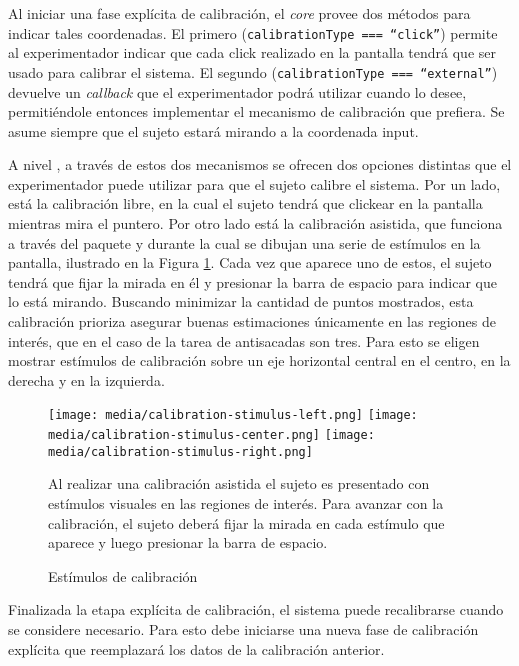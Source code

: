 Al iniciar una fase explícita de calibración, el \textit{core} provee dos
métodos para indicar tales coordenadas.
El primero (\texttt{calibrationType === “click”}) permite al experimentador
indicar que cada click realizado en la pantalla tendrá que ser usado para
calibrar el sistema.
El segundo (\texttt{calibrationType === “external”}) devuelve un
\textit{callback} que el experimentador podrá utilizar cuando lo desee,
permitiéndole entonces implementar el mecanismo de calibración que prefiera.
Se asume siempre que el sujeto estará mirando a la coordenada input.

A nivel \jspsych, a través de estos dos mecanismos se ofrecen dos opciones
distintas que el experimentador puede utilizar para que el sujeto calibre el
sistema.
Por un lado, está la calibración libre, en la cual el sujeto tendrá que
clickear en la pantalla mientras mira el puntero.
Por otro lado está la calibración asistida, que funciona a través del paquete
\psychophysics [0.2] y durante la cual se dibujan una serie de estímulos en la
pantalla, ilustrado en la Figura \ref{fig:calibration_stimulus}.
Cada vez que aparece uno de estos, el sujeto tendrá que fijar la mirada en él y
presionar la barra de espacio para indicar que lo está mirando.
Buscando minimizar la cantidad de puntos mostrados, esta calibración prioriza
asegurar buenas estimaciones únicamente en las regiones de interés, que en el
caso de la tarea de antisacadas son tres.
Para esto se eligen mostrar estímulos de calibración sobre un eje horizontal
central en el centro, en la derecha y en la izquierda.

\begin{figure}
    \centering
    \texttt{[image: media/calibration-stimulus-left.png]}
    \texttt{[image: media/calibration-stimulus-center.png]}
    \texttt{[image: media/calibration-stimulus-right.png]}
    \caption{Estímulos de calibración}
    Al realizar una calibración asistida el sujeto es presentado con estímulos
    visuales en las regiones de interés.
    Para avanzar con la calibración, el sujeto deberá fijar la mirada en cada
    estímulo que aparece y luego presionar la barra de espacio. \\
    \label{fig:calibration_stimulus}
\end{figure}

Finalizada la etapa explícita de calibración, el sistema puede recalibrarse
cuando se considere necesario.
Para esto debe iniciarse una nueva fase de calibración explícita que
reemplazará los datos de la calibración anterior.


